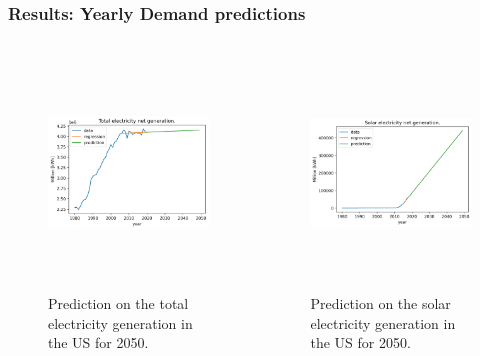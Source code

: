 \begin{frame}
\frametitle{Results: Yearly Demand predictions}
\begin{columns}
    \column[t]{5cm}
	\begin{figure}[htbp!]
		\begin{center}
			\includegraphics[height=6.2cm]{images/us-prediction1}
		\end{center}
		\caption{Prediction on the total electricity generation in the US for 2050.}
	\end{figure}

    \column[t]{5cm}
	\begin{figure}[htbp!]
		\begin{center}
			\includegraphics[height=6.2cm]{images/us-prediction2}
		\end{center}
		\caption{Prediction on the solar electricity generation in the US for 2050.}
	\end{figure}
\end{columns}
\end{frame}


